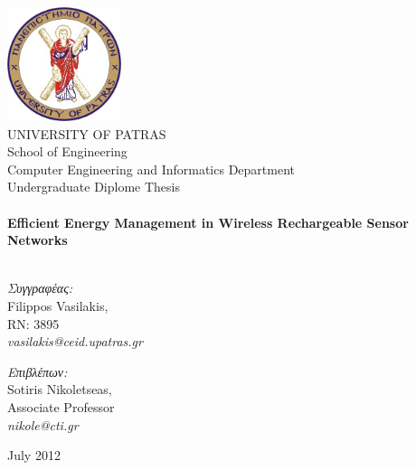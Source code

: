 \begin{titlingpage}
\begin{center}

\includegraphics[width=0.25\textwidth]{images/upatras_logo.jpg}\\[1cm]

\HUGE 	UNIVERSITY OF PATRAS\\
\LARGE	School of Engineering\\
\Huge	Computer Engineering and Informatics Department\\[1.5cm]

\LARGE Undergraduate Diplome Thesis\\[0.1cm]


\HRule \\[0.4cm]
{ \HUGE \bfseries Efficient Energy Management in Wireless Rechargeable Sensor Networks}\\[0.4cm]

\HRule \\[0.5cm]

\begin{minipage}{0.4\textwidth}
\begin{flushleft} \large
\textit{Συγγραφέας:}\\
Filippos Vasilakis, \\RN: 3895\\ \textit{vasilakis@ceid.upatras.gr}
\end{flushleft}
\end{minipage}
\begin{minipage}{0.4\textwidth}
\begin{flushright} \large
\textit{Επιβλέπων:} \\
Sotiris Nikoletseas, \\Associate Professor\\ \textit{nikole@cti.gr}
\end{flushright}
\end{minipage}

\vfill

{\large July 2012}

\end{center}

\end{titlingpage}

